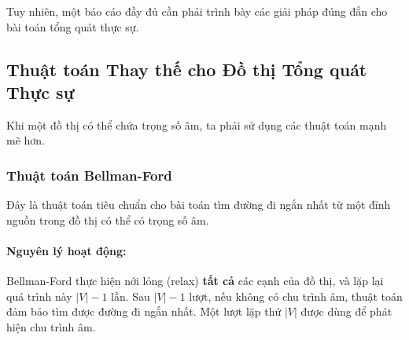 \documentclass[a4paper,12pt]{article}
\begin{document}
Tuy nhiên, một báo cáo đầy đủ cần phải trình bày các giải pháp đúng đắn cho bài toán tổng quát thực sự.

\subsection{Thuật toán Thay thế cho Đồ thị Tổng quát Thực sự}
Khi một đồ thị có thể chứa trọng số âm, ta phải sử dụng các thuật toán mạnh mẽ hơn.

\subsubsection{Thuật toán Bellman-Ford}
Đây là thuật toán tiêu chuẩn cho bài toán tìm đường đi ngắn nhất từ một đỉnh nguồn trong đồ thị có thể có trọng số âm.

\paragraph{Nguyên lý hoạt động:} Bellman-Ford thực hiện nới lỏng (relax) \textbf{tất cả} các cạnh của đồ thị, và lặp lại quá trình này $|V|-1$ lần. Sau $|V|-1$ lượt, nếu không có chu trình âm, thuật toán đảm bảo tìm được đường đi ngắn nhất. Một lượt lặp thứ $|V|$ được dùng để phát hiện chu trình âm.
\end{document}
